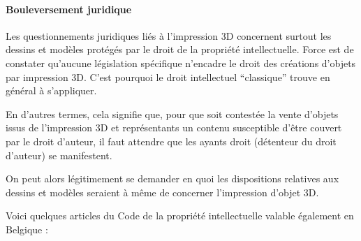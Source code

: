 \documentclass{article}
\begin{document}
\paragraph{Bouleversement juridique}\hfill

Les questionnements juridiques liés à l'impression 3D concernent surtout les dessins et modèles protégés par le droit de la propriété intellectuelle. Force est de constater qu'aucune législation spécifique n'encadre le droit des créations d'objets par impression 3D. C'est pourquoi le droit intellectuel “classique” trouve en général à s'appliquer.
 \par\leavevmode\par
En d'autres termes, cela signifie que, pour que soit contestée la vente d'objets issus de l'impression 3D et représentants un contenu susceptible d'être couvert par le droit d'auteur, il faut attendre que les ayants droit (détenteur du droit d'auteur) se manifestent.
 \par\leavevmode\par
On peut alors légitimement se demander en quoi les dispositions relatives aux dessins et modèles seraient à même de concerner l'impression d'objet 3D.
 \par\leavevmode\par
Voici quelques articles du Code de la propriété intellectuelle valable également en Belgique : 
\end{document}
